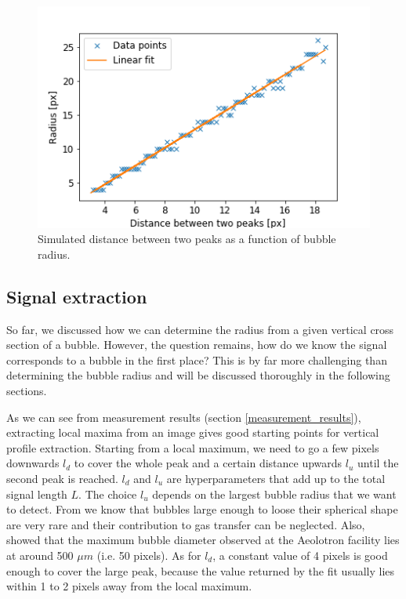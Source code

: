 		\begin{figure}
			\centering
			\includegraphics[scale=.6]{graphs/peak_distance_radius_fit.png}
			\caption{Simulated distance between two peaks as a function of bubble radius.}
			\label{fig:peaks_radius_fit}
		\end{figure}
	
	
	
	\subsection{Signal extraction}
		So far, we discussed how we can determine the radius from a given vertical cross section of a bubble. However, the question remains, how do we know the signal corresponds to a bubble in the first place? This is by far more challenging than determining the bubble radius and will be discussed thoroughly in the following sections. 
		
		As we can see from measurement results (section \ref{measurement_results}), extracting local maxima from an image gives good starting points for vertical profile extraction. Starting from a local maximum, we need to go a few pixels downwards $l_{d}$ to cover the whole peak and a certain distance upwards $l_u$ until the second peak is reached. $l_d$ and $l_u$ are hyperparameters that add up to the total signal length $L$. The choice $l_u$ depends on the largest bubble radius that we want to detect. From \citet{Al-Lashi2016} we know that bubbles large enough to loose their spherical shape are very rare and their contribution to gas transfer can be neglected. Also, \citet{Leonie} showed that the maximum bubble diameter observed at the Aeolotron facility lies at around 500 $\mu m$ (i.e. 50 pixels). As for $l_d$, a constant value of 4 pixels is good enough to cover the large peak, because the value returned by the fit usually lies within 1 to 2 pixels away from the local maximum. 	
	
